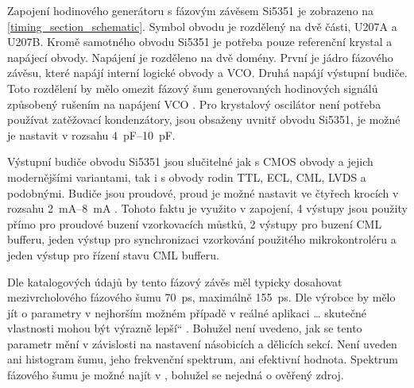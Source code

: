 Zapojení hodinového generátoru s fázovým závěsem Si5351 je zobrazeno na \ref{timing_section_schematic}. Symbol obvodu je rozdělený na dvě části, U207A a U207B. Kromě samotného obvodu Si5351 je potřeba pouze referenční krystal a napájecí obvody. Napájení je rozděleno na dvě domény. První je jádro fázového závěsu, které napájí interní logické obvody a \acrshort{VCO}. Druhá napájí výstupní budiče. Toto rozdělení by mělo omezit fázový šum generovaných hodinových signálů způsobený rušením na napájení \acrshort{VCO} \cite{Si5351applicationnote}. Pro krystalový oscilátor není potřeba používat zatěžovací kondenzátory, jsou obsaženy uvnitř obvodu Si5351, je možné je nastavit v rozsahu \SIrange{4}{10}{\pico\farad}.

Výstupní budiče obvodu Si5351 jsou slučitelné jak s \acrshort{CMOS} obvody a jejich modernějšími variantami, tak i s obvody rodin \acrshort{TTL}, \acrshort{ECL}, \acrshort{CML}, \acrshort{LVDS} a podobnými. Budiče jsou proudové, proud je možné nastavit ve čtyřech krocích v rozsahu \SIrange{2}{8}{\milli\ampere} \cite{Si5351datasheet}. Tohoto faktu je využito v zapojení, 4 výstupy jsou použity přímo pro proudové buzení vzorkovacích můstků, 2 výstupy pro buzení \acrshort{CML} bufferu, jeden výstup pro synchronizaci vzorkování použitého mikrokontroléru a jeden výstup pro řízení stavu \acrshort{CML} bufferu.

Dle katalogových údajů by tento fázový závěs měl typicky dosahovat mezivrcholového fázového šumu \SI{70}{\pico\second}, maximálně  \SI{155}{\pico\second}. Dle výrobce by mělo jít o parametry v \quotedblbase nejhorším možném případě v reálné aplikaci \ldots{} skutečné vlastnosti mohou být výrazně lepší\textquotedblleft{} \cite{Si5351datasheet}. Bohužel není uvedeno, jak se tento parametr mění v závislosti na nastavení násobicích a dělicích sekcí. Není uveden ani histogram šumu, jeho frekvenční spektrum, ani efektivní hodnota. Spektrum fázového šumu je možné najít v \cite{Si5351_phase_noise_measurement}, bohužel se nejedná o ověřený zdroj.

